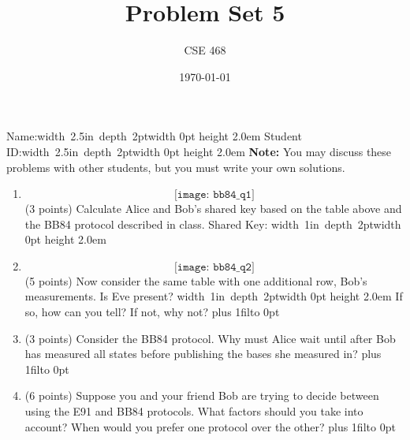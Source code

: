 \documentclass[12pt]{article}
\title{Problem Set 5}
\author{CSE 468}
\date{\today}
\newcommand{\Blank}{\mbox{\hskip 4pt\vrule width 1in depth 2pt}\vrule width 0pt height 2.0em}
\newcommand{\NameBlank}{\mbox{\hskip 4pt\vrule width 2.5in depth 2pt}\vrule width 0pt height 2.0em}
\def\DefaultSpace{1in}
\newcommand{\LeaveSpace}[1][\DefaultSpace]{%
\vskip #1 plus 1fil\relax\hbox to 0pt{\hss} %
}
\begin{document}

\noindent Name:\NameBlank{}  Student ID:\NameBlank{} \newline
\textbf{Note:} You may discuss these problems with other students, but you must write your own solutions. 

\begin{enumerate}[font=\bfseries]
    \item \[\texttt{[image: bb84\_q1]}\]
    (3 points) Calculate Alice and Bob's shared key based on the table above and the BB84 protocol described in class. \newline
    Shared Key: \Blank{}
    \item \[\texttt{[image: bb84\_q2]}\]
    (5 points) Now consider the same table with one additional row, Bob's measurements. \newline 
    Is Eve present? \Blank{} 
    \newline If so, how can you tell? If not, why not? \LeaveSpace[1.0in]
    \item (3 points) Consider the BB84 protocol. Why must Alice wait until after Bob has measured all states before publishing the bases she measured in? \LeaveSpace[1.0in] \newpage
    \item (6 points) Suppose you and your friend Bob are trying to decide between using the E91 and BB84 protocols. What factors should you take into account? When would you prefer one protocol over the other? \LeaveSpace[0.5in]

\end{enumerate}
\end{document}
